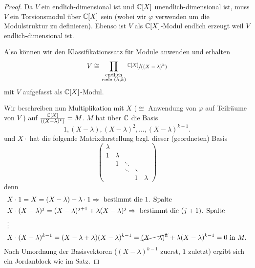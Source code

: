 \begin{proof}
	Da $V$ ein endlich-dimensional ist und $\C[X]$ unendlich-dimensional ist, muss $V$ ein Torsionsmodul über $\C[X]$ sein 
	(wobei wir $\varphi$ verwenden um die Modulstruktur zu definieren).
	Ebenso ist $V$ als $\C[X]$-Modul endlich erzeugt weil $V$ endlich-dimensional ist.

	Also können wir den Klassifikationssatz für Module anwenden und erhalten
	\[
		V \cong \prod_{\substack{\text{endlich}\\\text{viele } (\lambda,k)}} \sfrac{\C[X]}{((X-\lambda)^{k})} 
	\] 
	mit $V$ aufgefasst als $\C[X]$-Modul.

	Wir beschreiben nun Multiplikation mit $X$ ($\cong$ Anwendung von $\varphi$ auf Teilräume von $V$ ) auf
	$\frac{\C[X]}{((X-\lambda)^{k})} = M$. $M$ hat über $\C$ die Basis
	\[
		1, (X-\lambda), (X-\lambda)^2,\ldots, (X-\lambda)^{k-1}
	.\] 
	und $X \cdot $ hat die folgende Matrixdarstellung bzgl. dieser (geordneten) Basis
	\[
		\begin{pmatrix} 
			\lambda\\
			1 & \lambda\\
			  & 1 &\ddots\\
			  & &\ddots &\ddots\\
			  & & & 1 &\lambda
		\end{pmatrix} 
	\]
	denn
	\begin{align*}
		&X \cdot 1 = X = (X - \lambda) + \lambda \cdot 1 \implies \text{ bestimmt die 1. Spalte}\\
		&X \cdot (X - \lambda)^{j} = (X-\lambda)^{j+1} + \lambda (X - \lambda)^{j} \implies \text{ bestimmt die $(j+1)$. Spalte}\\
		&\vdots\\
		&X \cdot (X-\lambda)^{k-1} = (X - \lambda + \lambda) (X-\lambda)^{k-1} = \cancel{(X-\lambda)^{k}} + \lambda (X-\lambda)^{k-1} = 0 \text{ in } M
	.\end{align*}
	Nach Umordnung der Basisvektoren ($(X-\lambda)^{k-1}$ zuerst, $1$ zuletzt) ergibt sich ein Jordanblock wie im Satz.
\end{proof}



















